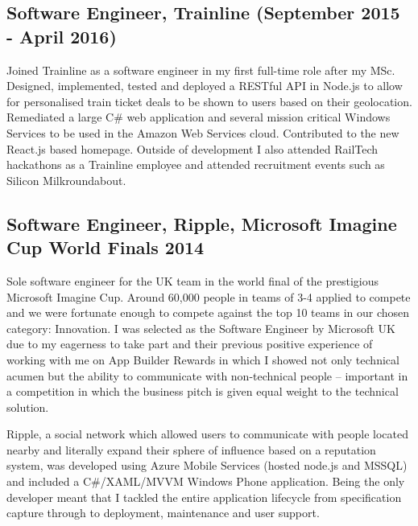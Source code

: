 \documentclass[10pt,letterpaper]{article}
\begin{document}
	\subsection*{Software Engineer, Trainline \small{(September 2015 - April 2016)}}
	Joined Trainline as a software engineer in my first full-time role after my MSc. Designed, implemented, tested and deployed a RESTful API in Node.js to allow for personalised train ticket deals to be shown to users based on their geolocation. Remediated a large C\# web application and several mission critical Windows Services to be used in the Amazon Web Services cloud. Contributed to the new React.js based homepage. Outside of development I also attended RailTech hackathons as a Trainline employee and attended recruitment events such as Silicon Milkroundabout.
	
	\subsection*{Software Engineer, Ripple, Microsoft Imagine Cup World Finals 2014}
	Sole software engineer for the UK team in the world final of the prestigious Microsoft Imagine Cup. Around 60,000 people in teams of 3-4 applied to compete and we were fortunate enough to compete against the top 10 teams in our chosen category: Innovation. I was selected as the Software Engineer by Microsoft UK due to my eagerness to take part and their previous positive experience of working with me on App Builder Rewards in which I showed not only technical acumen but the ability to communicate with non-technical people -- important in a competition in which the business pitch is given equal weight to the technical solution.

	Ripple, a social network which allowed users to communicate with people located nearby and literally expand their sphere of influence based on a reputation system, was developed using Azure Mobile Services (hosted node.js and MSSQL) and included a C\#/XAML/MVVM Windows Phone application. Being the only developer meant that I tackled the entire application lifecycle from specification capture through to deployment, maintenance and user support.
\end{document}
